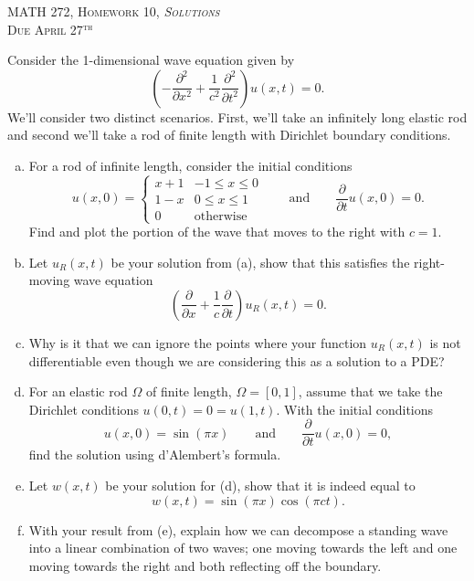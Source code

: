 \documentclass[12pt]{article} %
\begin{document}
\begin{center}
   \textsc{\large MATH 272, Homework 10, \emph{Solutions}}\\
   \textsc{Due April 27$^\textrm{th}$}
\end{center}
\vspace{.5cm}

\begin{problem}
Consider the 1-dimensional wave equation given by
\[
\left(-\frac{\partial^2}{\partial x^2} +\frac{1}{c^2} \frac{\partial^2}{\partial  t^2} \right) u(x,t) = 0.
\]
We'll consider two distinct scenarios. First, we'll take an infinitely long elastic rod and second we'll take a rod of finite length with Dirichlet boundary conditions.
\begin{enumerate}[(a)]
    \item For a rod of infinite length, consider the initial conditions
    \[
    u(x,0) = \begin{cases} x+1 & -1\leq x \leq 0 \\ 1-x & 0\leq x \leq 1 \\ 0 & \textrm{otherwise} \end{cases} \qquad \textrm{and} \qquad \frac{\partial}{\partial t} u(x,0) = 0.
    \]
    Find and plot the portion of the wave that moves to the right with $c=1$.
    \item Let $u_R(x,t)$ be your solution from (a), show that this satisfies the right-moving wave equation
    \[
    \left(\frac{\partial}{\partial x} + \frac{1}{c} \frac{\partial}{\partial t} \right)u_R(x,t) = 0.
    \]
    \item Why is it that we can ignore the points where your function $u_R(x,t)$ is not differentiable even though we are considering this as a solution to a PDE?
    \item For an elastic rod $\Omega$ of finite length, $\Omega = [0,1]$, assume that we take the Dirichlet conditions $u(0,t)=0=u(1,t)$.  With the initial conditions
    \[
    u(x,0) = \sin(\pi x) \qquad \textrm{and} \qquad \frac{\partial}{\partial t} u(x,0)=0,
    \]
    find the solution using d'Alembert's formula.
    \item Let $w(x,t)$ be your solution for (d), show that it is indeed equal to
    \[
    w(x,t) = \sin(\pi x)\cos(\pi c t).
    \]
    \item With your result from (e), explain how we can decompose a standing wave into a linear combination of two waves; one moving towards the left and one moving towards the right and both reflecting off the boundary.
\end{enumerate}
\end{problem}
\end{document}
